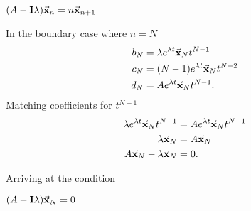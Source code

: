 \documentclass[main.tex]{subfiles}
\begin{document}
{\centering
\begin{eqbox}
    $
        (A - \vb{I}\lambda) \va{x}_{n} = n \va{x}_{n+1}
    $ 
\end{eqbox}
}

In the boundary case where $n=N$
\begin{align*}
    b_N &= \lambda e^{\lambda t} \va{x}_{N} t^{N-1} \\
    c_N &= (N-1) e^{\lambda t} \va{x}_{N} t^{N-2} \\
    d_N &= A e^{\lambda t} \va{x}_{N} t^{N-1}
.\end{align*}
Matching coefficients for $t^{N-1}$ 
\begin{align*}
    \lambda e^{\lambda t} \va{x}_{N} t^{N-1} &= A e^{\lambda t} \va{x}_{N} t^{N-1} \\
    \lambda \va{x}_{N} &= A \va{x}_{N} \\
    A \va{x}_{N} - \lambda \va{x}_{N} &= 0
.\end{align*}

Arriving at the condition

{\centering
\begin{eqbox}
    $
        (A - \vb{I}\lambda) \va{x}_{N} = 0
    $ 
\end{eqbox}
}

\end{document}
